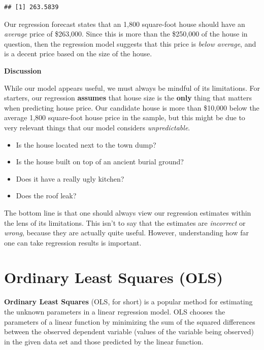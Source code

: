 \documentclass[
]{book}
\begin{document}
\begin{verbatim}
## [1] 263.5839
\end{verbatim}

Our regression forecast states that an 1,800 square-foot house should have an \emph{average} price of \$263,000. Since this is more than the \$250,000 of the house in question, then the regression model suggests that this price is \emph{below average}, and is a decent price based on the size of the house.

\textbf{Discussion}

While our model appears useful, we must always be mindful of its limitations. For starters, our regression \textbf{assumes} that house size is the \textbf{only} thing that matters when predicting house price. Our candidate house is more than \$10,000 below the average 1,800 square-foot house price in the sample, but this might be due to very relevant things that our model considers \emph{unpredictable}.

\begin{itemize}
\item
  Is the house located next to the town dump?
\item
  Is the house built on top of an ancient burial ground?
\item
  Does it have a really ugly kitchen?
\item
  Does the roof leak?
\end{itemize}

The bottom line is that one should always view our regression estimates within the lens of its limitations. This isn't to say that the estimates are \emph{incorrect} or \emph{wrong}, because they are actually quite useful. However, understanding how far one can take regression results is important.

\hypertarget{ordinary-least-squares-ols}{%
\section{Ordinary Least Squares (OLS)}\label{ordinary-least-squares-ols}}

\textbf{Ordinary Least Squares} (OLS, for short) is a popular method for estimating the unknown parameters in a linear regression model. OLS chooses the parameters of a linear function by minimizing the sum of the squared differences between the observed dependent variable (values of the variable being observed) in the given data set and those predicted by the linear function.
\end{document}
